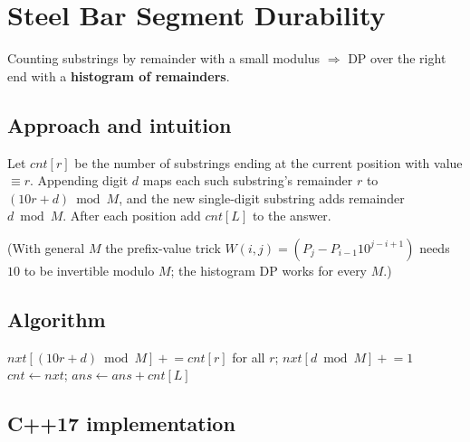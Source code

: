 \section{Steel Bar Segment Durability}
\label{sec:n-steel-bar}


\begin{patternbox}
Counting substrings by remainder with a small modulus $\Rightarrow$ DP over
the right end with a \textbf{histogram of remainders}.
\end{patternbox}

\subsection*{Approach and intuition}

Let $cnt[r]$ be the number of substrings ending at the current position with
value $\equiv r$. Appending digit $d$ maps each such substring's remainder $r$
to $(10r+d)\bmod M$, and the new single-digit substring adds remainder
$d\bmod M$. After each position add $cnt[L]$ to the answer.

(With general $M$ the prefix-value trick $W(i,j)=(P_j-P_{i-1}10^{j-i+1})$ needs
$10$ to be invertible modulo $M$; the histogram DP works for every $M$.)

\subsection*{Algorithm}
\begin{algorithmic}[1]
  \State $nxt[(10r+d)\bmod M]\mathrel{+}=cnt[r]$ for all $r$; $nxt[d\bmod M]\mathrel{+}=1$
  \State $cnt\gets nxt$; $ans\gets ans+cnt[L]$
\EndFor
\end{algorithmic}


\subsection*{C++17 implementation}

